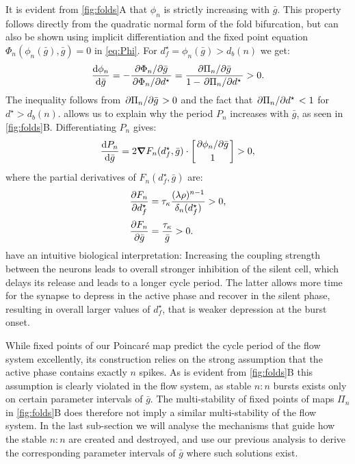 It is evident from \cref{fig:folds}A that $\phi_n$ is strictly increasing with $\bar g$.
This property follows directly from the quadratic normal form of the fold bifurcation, but can also be shown using implicit differentiation and the fixed point equation $\Phi_n(\phi_n(\bar g), \bar g)=0$ in \cref{eq:Phi}.
For $d^\star_f=\phi_n(\bar g)>d_b(n)$ we get:
\begin{equation}
	\label{eq:dstardg}
	\dv{\phi_n}{\bar g} = -\frac{\pdv*{\Phi_n}{\bar g}}{\pdv*{\Phi_n}{d^\star}} =
	\frac{\pdv*{\Pi_n}{\bar g}}{1-\pdv*{\Pi_n}{d^\star}}>0.
\end{equation}
The inequality follows from $\pdv*{\Pi_n}{\bar g}>0$ and the fact that $\pdv*{\Pi_n}{d^\star}<1$ for $d^\star>d_b(n)$.
 allows us to explain why the period $P_n$ increases with $\bar g$, as seen in \cref{fig:folds}B.
Differentiating $P_n$ gives:
\begin{equation}
	\label{eq:dPdg}
	\dv{P_{n}}{\bar g} = 2\grad F_n(d^\star_f, \bar g) \cdot
	\begin{bmatrix}\pdv*{\phi_n}{\bar g}\\[0.5ex] 1\end{bmatrix}>0,
\end{equation}
where the partial derivatives of $F_n(d^\star_f, \bar g)$ are:
\begin{align}
	\pdv{F_n}{d^\star_f} & = \tau_{\kappa} \frac{(\lambda\rho)^{n-1}}{\delta_n(d^\star_f)}>0, \\[0.5ex]
	\pdv{F_n}{\bar g}    & = \frac{\tau_{\kappa}}{\bar g}>0.
\end{align}
 have an intuitive biological interpretation: Increasing the coupling strength between the neurons leads to overall stronger inhibition of the silent cell, which delays its release and leads to a longer cycle period.
The latter allows more time for the synapse to depress in the active phase and recover in the silent phase, resulting in overall larger values of $d^\star_f$, that is weaker depression at the burst onset.

While fixed points of our Poincaré map predict the cycle period of the flow system excellently, its construction relies on the strong assumption that the active phase contains exactly $n$ spikes.
As is evident from \cref{fig:folds}B this assumption is clearly violated in the flow system, as stable $n:n$ bursts exists only on certain parameter intervals of $\bar g$.
The multi-stability of fixed points of maps $\Pi_{n}$ in \cref{fig:folds}B does therefore not imply a similar multi-stability of the flow system.
In the last sub-section we will analyse the mechanisms that guide how the stable $n:n$ are created and destroyed, and use our previous analysis to derive the corresponding parameter intervals of $\bar g$ where such solutions exist.

